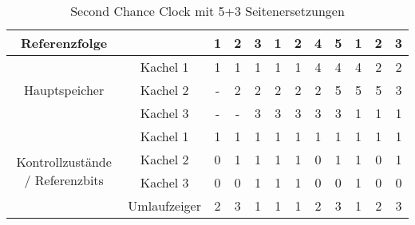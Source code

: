 \documentclass[a4paper]{article}
\begin{document}
\begin{table}[h]
    \centering
    \begin{tabular}{c c|c|c|c|c|c|c|c|c|c|c}
        \toprule
         Referenzfolge & & 1 & 2 & 3 & 1 & 2 & 4 & 5 & 1 & 2 & 3  \\
         \midrule
         \multirow{3}{*}{Hauptspeicher} &
         Kachel 1 & 1 & 1 & 1 & 1 & 1 & 4 & 4 & 4 & 2 & 2 \\ 
          & Kachel 2 & - & 2 & 2 & 2 & 2 & 2 & 5 & 5 &5 & 3 \\ 
           & Kachel 3 & - & - & 3 & 3 & 3 & 3 & 3 & 1& 1& 1\\ 
           \midrule
           \multirow{4}{*}{Kontrollzustände / Referenzbits} & 
           Kachel 1 & 1 & 1 & 1 & 1 & 1 & 1 & 1 & 1& 1 &1 \\ 
          & Kachel 2 & 0 & 1 & 1 & 1 & 1 & 0& 1 & 1& 0& 1\\ 
           & Kachel 3 & 0 & 0 & 1 & 1 & 1 & 0& 0 & 1& 0& 0\\ 
           & Umlaufzeiger & 2 & 3 & 1 & 1 & 1 & 2 & 3 & 1 & 2 & 3 \\ 
           \bottomrule
    \end{tabular}
    \caption{Second Chance Clock mit 5+3 Seitenersetzungen}
    \label{tab:my_label}
\end{table}
\end{document}
